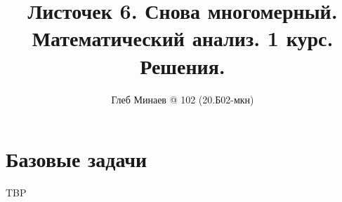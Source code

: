 \documentclass[12pt,a4paper]{article}
\title{Листочек 6. Снова многомерный.\\Математический анализ. 1 курс.\\Решения.}
\author{Глеб Минаев @ 102 (20.Б02-мкн)}
\newcommand{\HD}{\ensuremath{\mathrm{HD}}\xspace}
\begin{document}
    \maketitle

    \begin{multicols}{2}
        \tableofcontents
    \end{multicols}

    \section*{Базовые задачи}

    \begin{enumproblem}TBP






\end{enumproblem}
\end{document}
